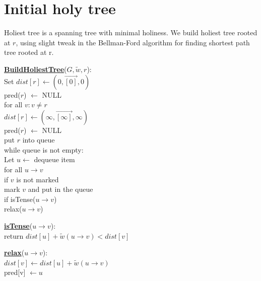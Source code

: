 \documentclass{article}
\begin{document}
\section{Initial holy tree}

Holiest tree is a spanning tree with minimal holiness. We build holiest tree 
rooted at $r$, using slight tweak in the Bellman-Ford algorithm for finding 
shortest path tree rooted at r. \\

\begin{minipage}[t]{0.48\linewidth}
\begin{algorithm}
\textbf{\underline{BuildHoliestTree}}($G, \tilde w , r$): \\ \quad
Set $dist[r] \leftarrow ( 0, \vec{[0]}, 0 )$ \\ \quad \quad
    pred($r$) $\leftarrow$ NULL \\ \quad
for all $v : v \neq r$ \\ \quad \quad
    $dist[r] \leftarrow ( \infty, \vec{[\infty]}, \infty )$ \\ \quad \quad
    pred($r$) $\leftarrow$ NULL \\ \quad
put $r$ into queue \\ \quad
while queue is not empty: \\ \quad \quad
    Let $u \leftarrow$ dequeue item \\ \quad \quad
    for all $u \rightarrow v$ \\ \qquad \quad
        if $v$ is not marked \\ \quad \qquad \quad
           mark $v$ and put in the queue \\ \qquad \quad
        if isTense($u \rightarrow v$) \\ \quad \qquad \quad
           relax($u \rightarrow v$)
\end{algorithm}
\end{minipage}
\hfill%
\hspace{-4cm}
\begin{minipage}[t]{0.48\linewidth}
\begin{algorithm}
\textbf{\underline{isTense}}($u \rightarrow v$): \\ \quad
return $dist[u] + \tilde w(u \rightarrow v) < dist[v]$ \\

\end{algorithm}

\vspace{0.5cm}

\begin{algorithm}
\textbf{\underline{relax}}($u \rightarrow v$): \\ \quad
$dist[v] \leftarrow dist[u] + \tilde w(u \rightarrow v)$ \\ \quad
pred[v] $\leftarrow u$ \\
\end{algorithm}
\end{minipage}
\end{document}
